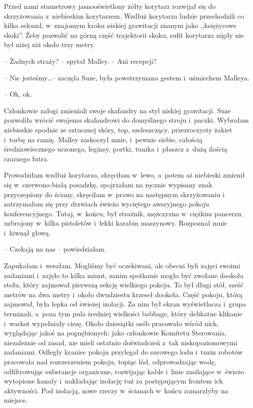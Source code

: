 \documentclass[oneside,polish,11pt,sfheadings]{mwbk}
\begin{document}
Przed nami stumetrowy jasnooświetlony żółty korytarz rozwijał się do
skrzyżowania z~niebieskim korytarzem. Wzdłuż korytarza ludzie
przechodzili co kilka sekund, w~znajomym kroku niskiej grawitacji znanym
jako ,,księżycowe skoki''. Żeby pozwolić na górną część trajektorii
skoku, sufit korytarza nigdy nie był niżej niż około trzy metry.

-- Żadnych straży? -- spytał Malley. -- Ani recepcji?

-- Nie jesteśmy\ldots  -- zaczęła Suze, była powstrzymana gestem i~uśmiechem
Malleya.

-- Ok, ok.

Członkowie załogi zmieniali swoje skafandry na styl niskiej grawitacji.
Suze pozwoliła wrócić swojemu skafandrowi do domyślnego stroju i~paczki.
Wybrałam niebieskie spodnie ze sztucznej skóry, top, szeleszczący,
przezroczysty żakiet i~torbę na ramię. Malley zaskoczył mnie, i~pewnie
siebie, całością średniowiecznego uczonego, leginsy, portki, tunika i~płaszcz z~dużą ilością czarnego futra.

Prowadziłam wzdłuż korytarza, skręciłam w~lewo, a~potem aż niebieski
zmienił się w~czerwono-białą posadzkę, spojrzałam na ręcznie wypisany
znak przyczepiony do ściany, skręciłam w~prawo na następnym skrzyżowaniu
i zatrzymałam się przy drzwiach świeżo wyciętego awaryjnego pokoju
konferencyjnego. Tutaj, w~końcu, był strażnik, mężczyzna w~ciężkim
pancerzu, uzbrojony w~kilka pistoletów i~lekki karabin maszynowy.
Rozpoznał mnie i~kiwnął głową.

-- Czekają na nas -- powiedziałam.

Zapukałam i~weszłam. Mogliśmy być oczekiwani, ale obecni byli zajęci
swoimi zadaniami i~zajęło to kilka minut, zanim spotkanie mogło być
zwołane dookoła stołu, który zajmował pierwszą sekcję wielkiego pokoju.
To był długi stół, sześć metrów na dwa metry i~około dwudziestu krzeseł
dookoła. Część pokoju, którą zajmował, była lepka od świeżej izolacji.
Za nim był ekran wyświetlacza i~grupa terminali, a~poza tym pula
średniej wielkości babbage, który delikatne klikanie i~warkot wypełniały
ciszę. Około dziesiątki osób pracowało wśród nich, wyglądając jakoś na
pognębionych: jako członkowie Komitetu Sterowania, niezależnie od zasad,
nie mieli ostatnio doświadczeń z~tak niskopoziomowymi zadaniami. Odległy
kraniec pokoju przylegał do surowego lodu i~tuzin robotów pracowała nad
rozszerzeniem pokoju, topiąc lód, odprowadzając wodę, odfiltrowując
substancje organiczne, rozwijając kable i~linie zasilające w~świeżo
wytopione kanały i~nakładając izolację tuż za postępującym frontem ich
aktywności. Pod izolacją, nowe rzeczy w~ścianach w~końcu zamarzłyby na
miejsce.
\end{document}
